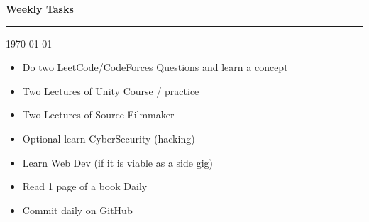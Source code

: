 \documentclass[12pt]{article}
\begin{document}
\begin{center}
    \Huge \textbf{Weekly Tasks}
\end{center}

\rule{\linewidth}{1.5pt}

\vspace{5pt}
\begin{center}
    \large \today
\end{center}
\vspace{20pt} %


%
%
\begin{itemize}

    \fontsize{20}{20}\selectfont

    \item Do two LeetCode/CodeForces Questions and learn a concept\vfill 

    \item Two Lectures of Unity Course / practice\vfill 

    \item Two Lectures of Source Filmmaker\vfill 

    \item Optional learn CyberSecurity (hacking)\vfill 

    \item Learn Web Dev (if it is viable as a side gig) \vfill 

    \item Read 1 page of a book Daily \vfill

    \item Commit daily on GitHub \vfill 


\end{itemize}


\end{document}

